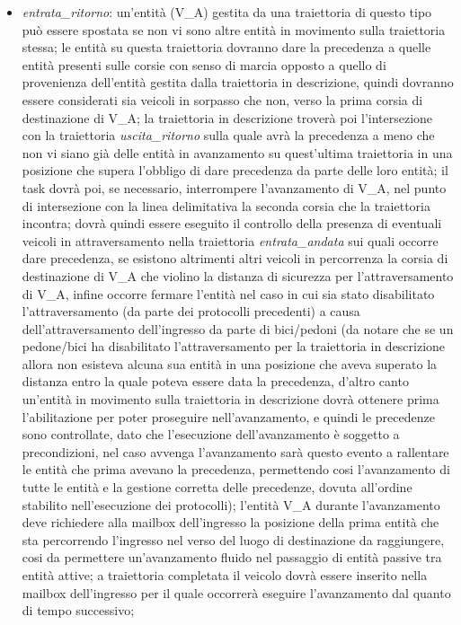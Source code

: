 \begin{enumerate}
\begin{itemize}
\item \textit{en\-tra\-ta\_ri\-tor\-no}: un'entità (V\_A) gestita da una traiettoria di questo tipo può essere spostata se non vi sono altre entità in movimento sulla traiettoria stessa; le entità su questa traiettoria dovranno dare la precedenza a quelle entità presenti sulle corsie con senso di marcia opposto a quello di provenienza dell'entità gestita dalla traiettoria in descrizione, quindi dovranno essere considerati sia veicoli in sorpasso che non, verso la prima corsia di destinazione di V\_A; la traiettoria in descrizione troverà poi l'intersezione con la traiettoria \textit{usci\-ta\_ri\-tor\-no} sulla quale avrà la precedenza a meno che non vi siano già delle entità in avanzamento su quest'ultima traiettoria in una posizione che supera l'obbligo di dare precedenza da parte delle loro entità; il task dovrà poi, se necessario, interrompere l'avanzamento di V\_A, nel punto di intersezione con la linea delimitativa la seconda corsia che la traiettoria incontra; dovrà quindi essere eseguito il controllo della presenza di eventuali veicoli in attraversamento nella traiettoria \textit{en\-tra\-ta\_an\-da\-ta} sui quali occorre dare precedenza, se esistono altrimenti altri veicoli in percorrenza la corsia di destinazione di V\_A che violino la distanza di sicurezza per l'attraversamento di V\_A, infine occorre fermare l'entità nel caso in cui sia stato disabilitato l'attraversamento (da parte dei protocolli precedenti) a causa dell'attraversamento dell'ingresso da parte di bici/pedoni (da notare che se un pedone/bici ha disabilitato l'attraversamento per la traiettoria in descrizione allora non esisteva alcuna sua entità in una posizione che aveva superato la distanza entro la quale poteva essere data la precedenza, d'altro canto un'entità in movimento sulla traiettoria in descrizione dovrà ottenere prima l'abilitazione per poter proseguire nell'avanzamento, e quindi le precedenze sono controllate, dato che l'esecuzione dell'avanzamento è soggetto a precondizioni, nel caso avvenga l'avanzamento sarà questo evento a rallentare le entità che prima avevano la precedenza, permettendo cosi l'avanzamento di tutte le entità e la gestione corretta delle precedenze, dovuta all'ordine stabilito nell'esecuzione dei protocolli); l'entità V\_A durante l'avanzamento deve richiedere alla mailbox dell'ingresso la posizione della prima entità che sta percorrendo l'ingresso nel verso del luogo di destinazione da raggiungere, cosi da permettere un'avanzamento fluido nel passaggio di entità passive tra entità attive; a traiettoria completata il veicolo dovrà essere inserito nella mailbox dell'ingresso per il quale occorrerà eseguire l'avanzamento dal quanto di tempo successivo;

\end{itemize}
\end{enumerate}
